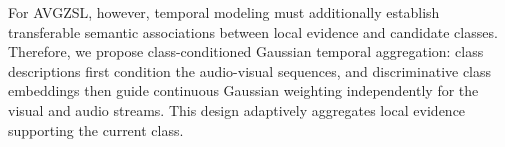 For AVGZSL, however, temporal modeling must additionally establish transferable semantic associations between local evidence and candidate classes. Therefore, we propose class-conditioned Gaussian temporal aggregation: class descriptions first condition the audio-visual sequences, and discriminative class embeddings then guide continuous Gaussian weighting independently for the visual and audio streams. This design adaptively aggregates local evidence supporting the current class.
